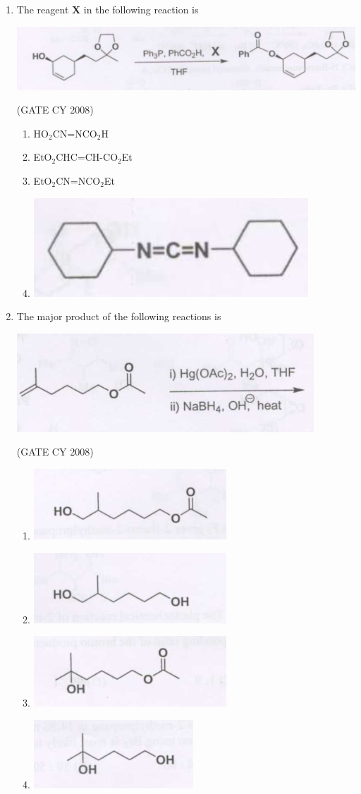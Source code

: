 \documentclass[12pt]{article}
\begin{document}
\begin{enumerate}
\item The reagent \textbf{X} in the following reaction is

\begin{center}
\includegraphics[width=0.6\columnwidth]{figs/q45.png}
\end{center}    \hfill{(GATE CY 2008)}
\begin{enumerate}
\item HO$_2$CN=NCO$_2$H
\item EtO$_2$CHC=CH-CO$_2$Et
\item EtO$_2$CN=NCO$_2$Et
\item \includegraphics[width=0.3\columnwidth]{figs/q45 d.png}
\end{enumerate}


\item The major product of the following reactions is

\begin{center}
\includegraphics[width=0.6\columnwidth]{figs/q46.png}
\end{center}    \hfill{(GATE CY 2008)}
\begin{enumerate}
    \item \includegraphics[width=0.3\columnwidth]{figs/q46 a.png}
    \item \includegraphics[width=0.3\columnwidth]{figs/q46 b.png}
    \item \includegraphics[width=0.3\columnwidth]{figs/q46 c.png}
    \item \includegraphics[width=0.3\columnwidth]{figs/q46 d.png}
\end{enumerate}



\end{enumerate}
\end{document}
